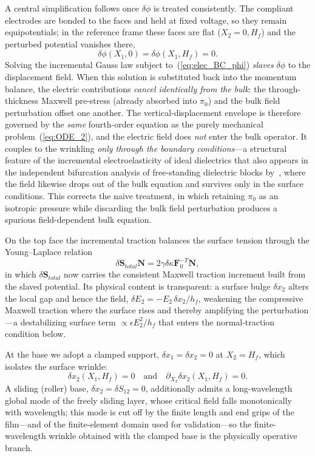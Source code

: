 \documentclass[final,3p,times]{elsarticle}
\begin{document}
A central simplification follows once $\delta\phi$ is treated consistently. The compliant electrodes are bonded to the faces and held at fixed voltage, so they remain equipotentials; in the reference frame these faces are flat ($X_2=0,H_f$) and the perturbed potential vanishes there,
\begin{equation}
	\delta\phi(X_1,0)=\delta\phi(X_1,H_f)=0 .
	\label{eq:elec_BC_phi}
\end{equation}
Solving the incremental Gauss law subject to~(\ref{eq:elec_BC_phi}) \emph{slaves} $\delta\phi$ to the displacement field. When this solution is substituted back into the momentum balance, the electric contributions \emph{cancel identically from the bulk}: the through-thickness Maxwell pre-stress (already absorbed into $\pi_0$) and the bulk field perturbation offset one another. The vertical-displacement envelope is therefore governed by the \emph{same} fourth-order equation as the purely mechanical problem~(\ref{eq:ODE_2}), and the electric field does \emph{not} enter the bulk operator. It couples to the wrinkling \emph{only through the boundary conditions}---a structural feature of the incremental electroelasticity of ideal dielectrics that also appears in the independent bifurcation analysis of free-standing dielectric blocks by~\citet{yangJAM2017}, where the field likewise drops out of the bulk equation and survives only in the surface conditions. This corrects the naive treatment, in which retaining $\pi_0$ as an isotropic pressure while discarding the bulk field perturbation produces a spurious field-dependent bulk equation.

On the top face the incremental traction balances the surface tension through the Young--Laplace relation
\begin{equation}
	\delta\mathbf{S}_{total} \mathbf{N} = 2\gamma\delta\kappa \mathbf{F}_0^{-T}\mathbf{N},
	\label{eq:BC_elec_gamma}
\end{equation}
in which $\delta\mathbf{S}_{total}$ now carries the consistent Maxwell traction increment built from the slaved potential. Its physical content is transparent: a surface bulge $\delta x_2$ alters the local gap and hence the field, $\delta E_2=-E_2\,\delta x_2/h_f$, weakening the compressive Maxwell traction where the surface rises and thereby amplifying the perturbation---a destabilizing surface term $\propto\epsilon E_2^2/h_f$ that enters the normal-traction condition below.

At the base we adopt a clamped support, $\delta x_1=\delta x_2=0$ at $X_2=H_f$, which isolates the surface wrinkle:
\begin{equation}
	\delta x_2(X_1,H_f)=0 \quad\text{and}\quad \partial_{X_2}\delta x_2(X_1,H_f)=0 .
	\label{eq:BC_bottom2}
\end{equation}
A sliding (roller) base, $\delta x_2=\delta S_{12}=0$, additionally admits a long-wavelength global mode of the freely sliding layer, whose critical field falls monotonically with wavelength; this mode is cut off by the finite length and end grips of the film---and of the finite-element domain used for validation---so the finite-wavelength wrinkle obtained with the clamped base is the physically operative branch.
\end{document}
